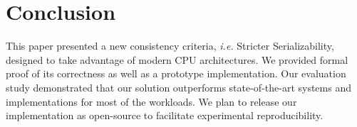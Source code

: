 \section{Conclusion}
This paper presented a new consistency criteria, \emph{i.e.} Stricter Serializability, designed to take advantage of modern CPU architectures.
We provided formal proof of its correctness as well as a prototype implementation.
Our evaluation study demonstrated that our solution outperforms state-of-the-art systems and implementations for most of the workloads. 
We plan to release our implementation as open-source to facilitate experimental reproducibility. 
